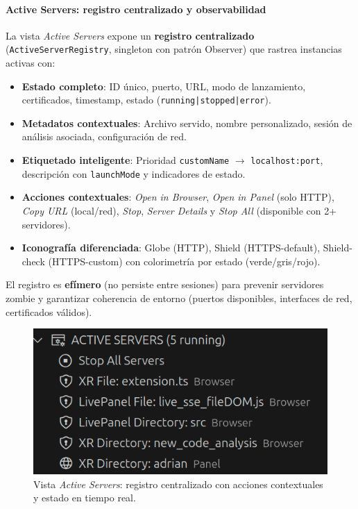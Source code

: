 \documentclass[a4paper, 12pt]{book}
\begin{document}
\paragraph{Active Servers: registro centralizado y observabilidad}
La vista \emph{Active Servers} expone un \textbf{registro centralizado} (\texttt{ActiveServerRegistry}, singleton con patrón Observer) que rastrea instancias activas con:

\begin{itemize}
  \item \textbf{Estado completo}: ID único, puerto, URL, modo de lanzamiento, certificados, timestamp, estado (\texttt{running|stopped|error}).
  \item \textbf{Metadatos contextuales}: Archivo servido, nombre personalizado, sesión de análisis asociada, configuración de red.
  \item \textbf{Etiquetado inteligente}: Prioridad \texttt{customName} $\rightarrow$ \texttt{localhost:port}, descripción con \texttt{launchMode} y indicadores de estado.
  \item \textbf{Acciones contextuales}: \emph{Open in Browser}, \emph{Open in Panel} (solo HTTP), \emph{Copy URL} (local/red), \emph{Stop}, \emph{Server Details} y \emph{Stop All} (disponible con 2+ servidores).
  \item \textbf{Iconografía diferenciada}: Globe (HTTP), Shield (HTTPS-default), Shield-check (HTTPS-custom) con colorimetría por estado (verde/gris/rojo).
\end{itemize}

El registro es \textbf{efímero} (no persiste entre sesiones) para prevenir servidores zombie y garantizar coherencia de entorno (puertos disponibles, interfaces de red, certificados válidos).

\begin{figure}[H]
\centering
\includegraphics[width=0.62\linewidth]{img/ui-active-servers.png}
\caption{Vista \emph{Active Servers}: registro centralizado con acciones contextuales y estado en tiempo real.}
\label{fig:ui-active-servers}
\end{figure}
\end{document}
